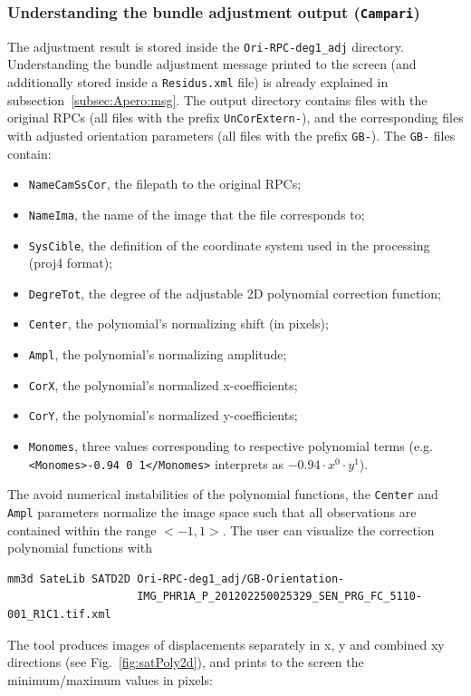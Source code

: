 \subsubsection*{Understanding the bundle adjustment output ({\tt Campari})} 
%
The adjustment result is stored inside the {\texttt{Ori-RPC-deg1\_adj}} directory. Understanding the bundle adjustment message printed to the screen (and additionally stored inside a {\tt Residus.xml} file) is already explained in subsection~\ref{subsec:Apero:msg}. The output directory contains files with the original RPCs (all files with the prefix {\tt UnCorExtern-}), and the corresponding files with adjusted orientation parameters (all files with the prefix {\tt GB-}). The {\tt GB-} files contain:
\begin{itemize}
\item {\tt NameCamSsCor}, the filepath to the original RPCs;
\item {\tt NameIma}, the name of the image that the file corresponds to;
\item {\tt SysCible}, the definition of the coordinate system used in the processing (proj4 format);
\item {\tt DegreTot}, the degree of the adjustable 2D polynomial correction function;
\item {\tt Center}, the polynomial's normalizing shift (in pixels);
\item {\tt Ampl}, the polynomial's normalizing amplitude;
\item {\tt CorX}, the polynomial's normalized x-coefficients;
\item {\tt CorY}, the polynomial's normalized y-coefficients;
\item {\tt Monomes}, three values corresponding to respective polynomial terms (e.g. \texttt{<Monomes>-0.94 0 1</Monomes>} interprets as $-0.94 \cdot x^0 \cdot y^1 $). 
\end{itemize}
The avoid numerical instabilities of the polynomial functions, the {\tt Center} and {\tt Ampl} parameters normalize the image space such that all observations are contained within the range $<-1,1>$. The user can visualize the correction polynomial functions with 
\begin{verbatim}
mm3d SateLib SATD2D Ori-RPC-deg1_adj/GB-Orientation-
                    IMG_PHR1A_P_201202250025329_SEN_PRG_FC_5110-001_R1C1.tif.xml
\end{verbatim}
%
The tool produces images of displacements separately in x, y and combined xy directions (see Fig.~\ref{fig:satPoly2d}), and prints to the screen the minimum/maximum values in pixels:
